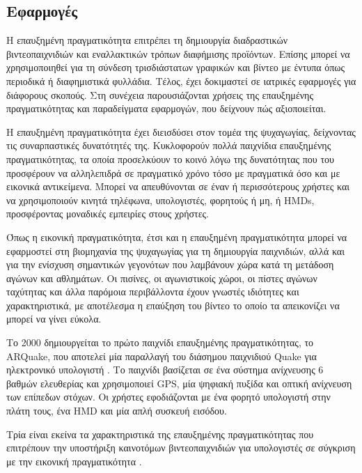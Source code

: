 \subsection{Εφαρμογές} \label{sec:apps}

Η επαυξημένη πραγματικότητα επιτρέπει τη δημιουργία διαδραστικών βιντεοπαιχνιδιών και εναλλακτικών τρόπων διαφήμισης προϊόντων. Επίσης μπορεί να χρησιμοποιηθεί για τη σύνδεση τρισδιάστατων γραφικών και βίντεο με έντυπα όπως περιοδικά ή διαφημιστικά φυλλάδια. Τέλος, έχει δοκιμαστεί σε ιατρικές εφαρμογές για διάφορους σκοπούς. Στη συνέχεια παρουσιάζονται χρήσεις της επαυξημένης πραγματικότητας και παραδείγματα εφαρμογών, που δείχνουν πώς αξιοποιείται.  




Η επαυξημένη πραγματικότητα έχει διεισδύσει στον τομέα της ψυχαγωγίας, δείχνοντας τις συναρπαστικές δυνατότητές της. Κυκλοφορούν πολλά παιχνίδια επαυξημένης πραγματικότητας, τα οποία προσελκύουν το κοινό λόγω της δυνατότητας που του προσφέρουν να αλληλεπιδρά σε πραγματικό χρόνο τόσο με πραγματικά όσο και με εικονικά αντικείμενα. Μπορεί να απευθύνονται σε έναν ή περισσότερους χρήστες και να χρησιμοποιούν κινητά τηλέφωνα, υπολογιστές, φορητούς ή μη, ή ΗΜDs, προσφέροντας μοναδικές εμπειρίες στους χρήστες. 


Όπως η εικονική πραγματικότητα, έτσι και η επαυξημένη πραγματικότητα μπορεί να εφαρμοστεί στη βιομηχανία της ψυχαγωγίας για τη δημιουργία παιχνιδιών, αλλά και για την ενίσχυση  σημαντικών γεγονότων που λαμβάνουν χώρα κατά τη μετάδοση αγώνων και αθλημάτων. Οι πισίνες, οι αγωνιστικοίς χώροι, οι πίστες αγώνων ταχύτητας και άλλα παρόμοια περιβάλλοντα έχουν γνωστές ιδιότητες και χαρακτηριστικά, με αποτέλεσμα η επαύξηση του βίντεο το οποίο τα απεικονίζει να μπορεί να γίνει εύκολα.


Το 2000 δημιουργείται το πρώτο παιχνίδι επαυξημένης πραγματικότητας, το ARQuake, που αποτελεί μία παραλλαγή του διάσημου παιχνιδιού Quake για ηλεκτρονικό υπολογιστή \cite{arquake}. Το παιχνίδι βασίζεται σε ένα σύστημα ανίχνευσης 6 βαθμών ελευθερίας και χρησιμοποιεί GPS, μία ψηφιακή πυξίδα και οπτική ανίχνευση των επίπεδων στόχων. Οι χρήστες εφοδιάζονται με ένα φορητό υπολογιστή στην πλάτη τους, ένα HMD και μία απλή συσκευή εισόδου.



Τρία είναι εκείνα τα χαρακτηριστικά της επαυξημένης πραγματικότητας που επιτρέπουν την υποστήριξη καινοτόμων βιντεοπαιχνιδιών για υπολογιστές σε σύγκριση με την εικονική πραγματικότητα \cite{Thomas2012}.




